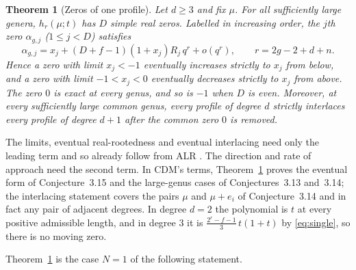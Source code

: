 \documentclass[11pt,a4paper]{article}
\newtheorem{theorem}{Theorem}[section]
\theoremstyle{definition}\newtheorem{definition}[theorem]{Definition}
\theoremstyle{remark}\newtheorem{remark}[theorem]{Remark}\newtheorem{example}[theorem]{Example}
\numberwithin{equation}{section}
\begin{document}
\begin{theorem}[Zeros of one profile]\label{th:roots}
Let $d\ge3$ and fix $\mu$. For all sufficiently large genera, $h_r(\mu;t)$ has $D$ simple real zeros. Labelled in increasing order, the $j$th zero $\alpha_{g,j}$ ($1\le j<D$) satisfies
\begin{equation}\label{eq:shift}
 \alpha_{g,j}=x_j+(D+f-1)(1+x_j)R_j\,q^{r}+o(q^{r}),\qquad r=2g-2+d+n .
\end{equation}
Hence a zero with limit $x_j<-1$ eventually increases strictly to $x_j$ from below, and a zero with limit $-1<x_j<0$ eventually decreases strictly to $x_j$ from above. The zero $0$ is exact at every genus, and so is $-1$ when $D$ is even. Moreover, at every sufficiently large common genus, every profile of degree $d$ strictly interlaces every profile of degree $d+1$ after the common zero $0$ is removed.
\end{theorem}

The limits, eventual real-rootedness and eventual interlacing need only the leading term and so already follow from ALR \cite{alr}. The direction and rate of approach need the second term. In CDM's terms, Theorem~\ref{th:roots} proves the eventual form of Conjecture~3.15 and the large-genus cases of Conjectures~3.13 and~3.14; the interlacing statement covers the pairs $\mu$ and $\mu+e_i$ of Conjecture~3.14 and in fact any pair of adjacent degrees. In degree $d=2$ the polynomial is $t$ at every positive admissible length, and in degree $3$ it is $\frac{2^r-f-1}{3}\,t(1+t)$ by \eqref{eq:single}, so there is no moving zero.

Theorem~\ref{th:roots} is the case $N=1$ of the following statement.
\end{document}

